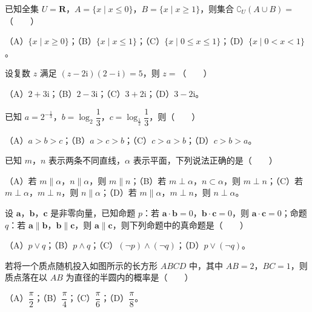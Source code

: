 \begin{question}
已知全集 $U=\mathbf R$，$A=\{x\mid x\leqslant 0\}$，$B=\{x\mid x\geqslant 1\}$，则集合 $\complement_U(A\cup B)=$\mbox{（　　）}

（A）$\{x\mid x\geqslant 0\}$；（B）$\{x\mid x\leqslant 1\}$；（C）$\{x\mid 0\leqslant x\leqslant 1\}$；（D）$\{x\mid 0<x<1\}$。

\end{question}
\begin{question}
设复数 $z$ 满足 $(z-2\mathrm i)(2-\mathrm i)=5$，则 $z=$\mbox{（　　）}

（A）$2+3\mathrm i$；（B）$2-3\mathrm i$；（C）$3+2\mathrm i$；（D）$3-2\mathrm i$。

\end{question}
\begin{question}
已知 $a=2^{-\frac13}$，$b=\log_2\dfrac13$，$c=\log_{\frac12}\dfrac13$，则\mbox{（　　）}

（A）$a>b>c$；（B）$a>c>b$；（C）$c>a>b$；（D）$c>b>a$。

\end{question}
\begin{question}
已知 $m$，$n$ 表示两条不同直线，$\alpha$ 表示平面，下列说法正确的是\mbox{（　　）}

（A）若 $m\parallel\alpha$，$n\parallel\alpha$，则 $m\parallel n$；（B）若 $m\perp\alpha$，$n\subset\alpha$，则 $m\perp n$；（C）若 $m\perp\alpha$，$m\perp n$，则 $n\parallel\alpha$；（D）若 $m\parallel\alpha$，$m\perp n$，则 $n\perp\alpha$。

\end{question}
\begin{question}
设 $\boldsymbol a$，$\boldsymbol b$，$\boldsymbol c$ 是非零向量，已知命题 $p$：若 $\boldsymbol a\cdot\boldsymbol b=0$，$\boldsymbol b\cdot\boldsymbol c=0$，则 $\boldsymbol a\cdot\boldsymbol c=0$；命题 $q$：若 $\boldsymbol a\parallel\boldsymbol b$，$\boldsymbol b\parallel\boldsymbol c$，则 $\boldsymbol a\parallel\boldsymbol c$，则下列命题中的真命题是\mbox{（　　）}

（A）$p\vee q$；（B）$p\wedge q$；（C）$(\neg p)\wedge(\neg q)$；（D）$p\vee(\neg q)$。

\Needspace{0.4\textheight}
\end{question}
\begin{question}
若将一个质点随机投入如图所示的长方形 $ABCD$ 中，其中 $AB=2$，$BC=1$，则质点落在以 $AB$ 为直径的半圆内的概率是\mbox{（　　）}
\nopagebreak[4]
\begin{center}\end{center}
\nopagebreak[4]
（A）$\dfrac\pi2$；（B）$\dfrac\pi4$；（C）$\dfrac\pi6$；（D）$\dfrac\pi8$。

\Needspace{0.4\textheight}
\end{question}
